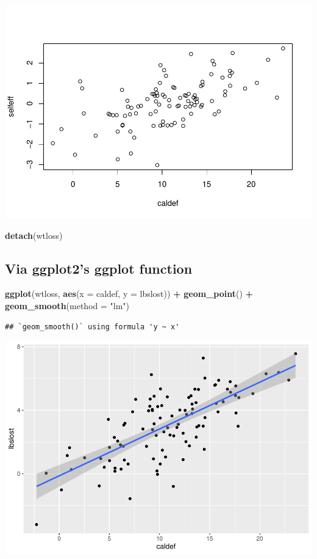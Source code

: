 \documentclass[]{article}
\newenvironment{Shaded}{\begin{snugshade}}{\end{snugshade}}
\newcommand{\KeywordTok}[1]{\textcolor[rgb]{0.13,0.29,0.53}{\textbf{#1}}}
\newcommand{\DataTypeTok}[1]{\textcolor[rgb]{0.13,0.29,0.53}{#1}}
\newcommand{\StringTok}[1]{\textcolor[rgb]{0.31,0.60,0.02}{#1}}
\newcommand{\OperatorTok}[1]{\textcolor[rgb]{0.81,0.36,0.00}{\textbf{#1}}}
\newcommand{\NormalTok}[1]{#1}
\begin{document}
\includegraphics{wtloss_notebook_files/figure-latex/unnamed-chunk-8-3.pdf}

\begin{Shaded}
\begin{Highlighting}[]
\KeywordTok{detach}\NormalTok{(wtloss)}
\end{Highlighting}
\end{Shaded}

\subsection{Via ggplot2's ggplot
function}\label{via-ggplot2s-ggplot-function-1}

\begin{Shaded}
\begin{Highlighting}[]
\KeywordTok{ggplot}\NormalTok{(wtloss, }\KeywordTok{aes}\NormalTok{(}\DataTypeTok{x =}\NormalTok{ caldef, }\DataTypeTok{y =}\NormalTok{ lbslost)) }\OperatorTok{+}
\StringTok{  }\KeywordTok{geom_point}\NormalTok{() }\OperatorTok{+}
\StringTok{  }\KeywordTok{geom_smooth}\NormalTok{(}\DataTypeTok{method =} \StringTok{"lm"}\NormalTok{)}
\end{Highlighting}
\end{Shaded}

\begin{verbatim}
## `geom_smooth()` using formula 'y ~ x'
\end{verbatim}

\includegraphics{wtloss_notebook_files/figure-latex/unnamed-chunk-9-1.pdf}
\end{document}
